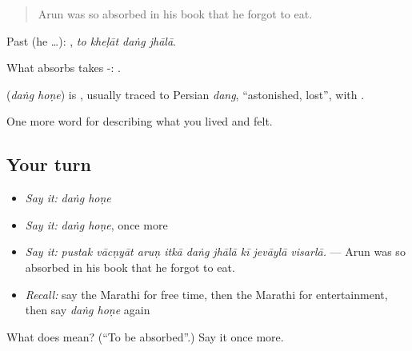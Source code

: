 \begin{quote}
Arun was so absorbed in his book that he forgot to eat.
\end{quote}

Past (he …):    , \emph{to kheḷāt daṅg jhālā}.

What absorbs takes -:   .

\begin{cousinweb}
\textbf{ } (\emph{daṅg hoṇe}) is , usually traced to Persian \emph{dang}, \textquotedblleft{}astonished, lost\textquotedblright{}, with .
\end{cousinweb}

\begin{grammarlens}[title={What you've built}]
One more word for describing what you lived and felt.
\end{grammarlens}

\subsection*{Your turn}
\begin{itemize}
\raggedright
  \item \emph{Say it:} \emph{daṅg hoṇe}
  \item \emph{Say it:} \emph{daṅg hoṇe}, once more
  \item \emph{Say it:} \emph{pustak vācṇyāt aruṇ itkā daṅg jhālā kī jevāylā visarlā.} — Arun was so absorbed in his book that he forgot to eat.
  \item \emph{Recall:} say the Marathi for free time, then the Marathi for entertainment, then say \emph{daṅg hoṇe} again
\end{itemize}

\begin{tcolorbox}[breakable,colback=teal!4,colframe=teal!35!black,title={Before you move on}]
What does   mean? (\textquotedblleft{}To be absorbed\textquotedblright{}.) Say it once more.
\end{tcolorbox}
